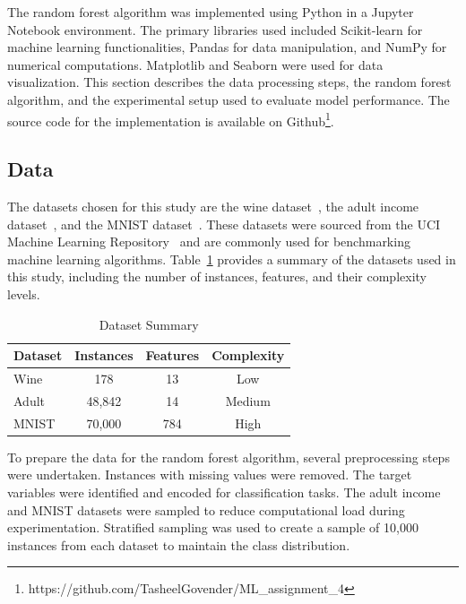 \documentclass[conference]{IEEEtran}
\begin{document}
The random forest algorithm was implemented using Python in a Jupyter Notebook environment. The primary libraries used included Scikit-learn for machine learning functionalities, Pandas for data manipulation, and NumPy for numerical computations. Matplotlib and Seaborn were used for data visualization. This section describes the data processing steps, the random forest algorithm, and the experimental setup used to evaluate model performance. The source code for the implementation is available on Github\footnote{https://github.com/TasheelGovender/ML\_assignment\_4}.

\subsection{Data}

The datasets chosen for this study are the wine dataset~\cite{Lichman2013wine}, the adult income dataset~\cite{Dheeru2017adult}, and the MNIST dataset~\cite{LeCun1998mnist}. These datasets were sourced from the UCI Machine Learning Repository~\cite{Dua2019} and are commonly used for benchmarking machine learning algorithms. Table~\ref{tab:dataset_summary} provides a summary of the datasets used in this study, including the number of instances, features, and their complexity levels.

\begin{table}[htbp]
    \caption{Dataset Summary}
    \label{tab:dataset_summary}
    \centering
    \begin{tabular}{|l|c|c|c|}
        \hline
        \textbf{Dataset} & \textbf{Instances} & \textbf{Features} & \textbf{Complexity} \\
        \hline
        Wine & 178 & 13 & Low \\
        Adult & 48,842 & 14 & Medium \\
        MNIST & 70,000 & 784 & High \\
        \hline
    \end{tabular}
\end{table}

To prepare the data for the random forest algorithm, several preprocessing steps were undertaken. Instances with missing values were removed. The target variables were identified and encoded for classification tasks. The adult income and MNIST datasets were sampled to reduce computational load during experimentation. Stratified sampling was used to create a sample of 10,000 instances from each dataset to maintain the class distribution.
\end{document}
